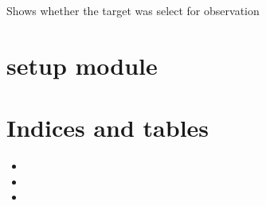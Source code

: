 \documentclass[letterpaper,10pt,english]{sphinxmanual}
\begin{document}
\begin{fulllineitems}
\begin{fulllineitems}
\end{fulllineitems}


\begin{fulllineitems}
\label{astroobs:astroobs.Observation.ticked}
Shows whether the target was select for observation

\end{fulllineitems}


\end{fulllineitems}



\chapter{setup module}
\label{setup:setup-module}\label{setup::doc}

\chapter{Indices and tables}
\label{index:indices-and-tables}\begin{itemize}
\item {} 

\item {} 

\item {} 

\end{itemize}



\renewcommand{\indexname}{Index}
\printindex
\end{document}
